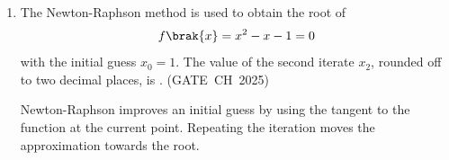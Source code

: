\begin{enumerate}[label=\thesubsection.\arabic*, ref=\thesubsection.\theenumi,itemsep=0pt]
From the trace relation in \eqref{eq:eigen_trace}, the sum of the eigenvalues is
\begin{align}
\lambda_1+\lambda_2&=\brak{2-\sqrt{3}}+\brak{2+\sqrt{3}}\\
&=4.
\end{align}
The trace of the matrix is
\begin{align}
\operatorname{tr}\brak{\vec{A}}=2+2=4.
\end{align}
Hence,
\begin{align}
\boxed{\lambda_1+\lambda_2=\operatorname{tr}\brak{\vec{A}}}.
\end{align}
Using the given value $\lambda_1=0.27$ and the trace,
\begin{align}
\lambda_2&=4-0.27\\
&=3.73.
\end{align}
The code to verify this is:
\begin{lstlisting}[frame=single, basicstyle=\rmfamily, escapeinside={(*@}{@*)}]
(*@\makebox[\dimexpr\linewidth-2\fboxsep-2\fboxrule\relax][c]{codes/q45/main.py}@*)
\end{lstlisting}

\item The Newton-Raphson method is used to obtain the root of
\begin{align}
f\brak{x}=x^2-x-1=0
\end{align}
with the initial guess $x_{0}=1$. The value of the second iterate $x_{2}$, rounded off to two decimal places, is \underline{\hspace{2cm}}. \hfill (GATE~CH~2025)

\solution Newton-Raphson improves an initial guess by using the tangent to the function at the current point. Repeating the iteration moves the approximation towards the root.


\end{enumerate}
